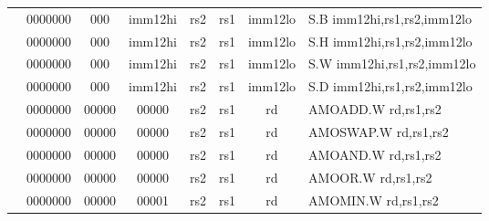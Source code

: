 \begin{table}[p]
\begin{small}
\begin{center}
\begin{tabular}{rcccccccccl}
&
\multicolumn{1}{|c|}{0000000} &
\multicolumn{2}{c|}{000} &
\multicolumn{3}{c|}{imm12hi} &
\multicolumn{1}{c|}{rs2} &
\multicolumn{1}{c|}{rs1} &
\multicolumn{1}{c|}{imm12lo} & S.B imm12hi,rs1,rs2,imm12lo \\
\cline{2-10}
  

&
\multicolumn{1}{|c|}{0000000} &
\multicolumn{2}{c|}{000} &
\multicolumn{3}{c|}{imm12hi} &
\multicolumn{1}{c|}{rs2} &
\multicolumn{1}{c|}{rs1} &
\multicolumn{1}{c|}{imm12lo} & S.H imm12hi,rs1,rs2,imm12lo \\
\cline{2-10}
  

&
\multicolumn{1}{|c|}{0000000} &
\multicolumn{2}{c|}{000} &
\multicolumn{3}{c|}{imm12hi} &
\multicolumn{1}{c|}{rs2} &
\multicolumn{1}{c|}{rs1} &
\multicolumn{1}{c|}{imm12lo} & S.W imm12hi,rs1,rs2,imm12lo \\
\cline{2-10}
  

&
\multicolumn{1}{|c|}{0000000} &
\multicolumn{2}{c|}{000} &
\multicolumn{3}{c|}{imm12hi} &
\multicolumn{1}{c|}{rs2} &
\multicolumn{1}{c|}{rs1} &
\multicolumn{1}{c|}{imm12lo} & S.D imm12hi,rs1,rs2,imm12lo \\
\cline{2-10}
  

&
\multicolumn{1}{|c|}{0000000} &
\multicolumn{3}{c|}{00000} &
\multicolumn{2}{c|}{00000} &
\multicolumn{1}{c|}{rs2} &
\multicolumn{1}{c|}{rs1} &
\multicolumn{1}{c|}{rd} & AMOADD.W rd,rs1,rs2 \\
\cline{2-10}
  

&
\multicolumn{1}{|c|}{0000000} &
\multicolumn{3}{c|}{00000} &
\multicolumn{2}{c|}{00000} &
\multicolumn{1}{c|}{rs2} &
\multicolumn{1}{c|}{rs1} &
\multicolumn{1}{c|}{rd} & AMOSWAP.W rd,rs1,rs2 \\
\cline{2-10}
  

&
\multicolumn{1}{|c|}{0000000} &
\multicolumn{3}{c|}{00000} &
\multicolumn{2}{c|}{00000} &
\multicolumn{1}{c|}{rs2} &
\multicolumn{1}{c|}{rs1} &
\multicolumn{1}{c|}{rd} & AMOAND.W rd,rs1,rs2 \\
\cline{2-10}
  

&
\multicolumn{1}{|c|}{0000000} &
\multicolumn{3}{c|}{00000} &
\multicolumn{2}{c|}{00000} &
\multicolumn{1}{c|}{rs2} &
\multicolumn{1}{c|}{rs1} &
\multicolumn{1}{c|}{rd} & AMOOR.W rd,rs1,rs2 \\
\cline{2-10}
  

&
\multicolumn{1}{|c|}{0000000} &
\multicolumn{3}{c|}{00000} &
\multicolumn{2}{c|}{00001} &
\multicolumn{1}{c|}{rs2} &
\multicolumn{1}{c|}{rs1} &
\multicolumn{1}{c|}{rd} & AMOMIN.W rd,rs1,rs2 \\
\cline{2-10}
  


\end{tabular}
\end{center}
\end{small}
\end{table}

